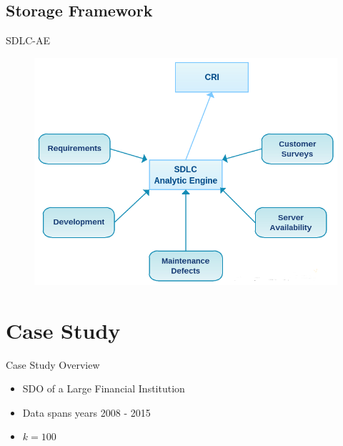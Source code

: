     \subsection{Storage Framework}
        \begin{frame}{SDLC-AE}
            \begin{figure}[ht]
                \centering
                \includegraphics[scale=.5]{images/sdlcae.png}
            \end{figure}
        \end{frame}

\section{Case Study}
        \begin{frame}{Case Study Overview}
            \begin{itemize}
                \item SDO of a Large Financial Institution
                \item Data spans years 2008 - 2015
                \item $k = 100$
            \end{itemize}
        \end{frame}
